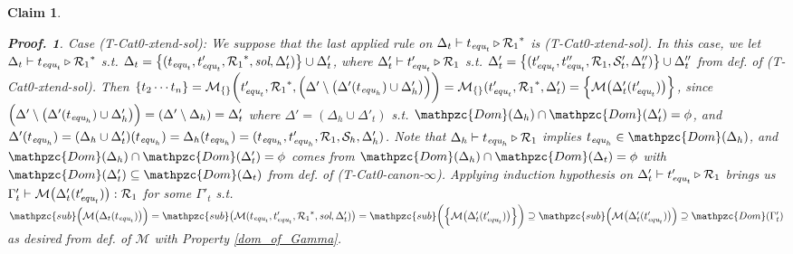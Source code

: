 \documentclass[12pt]{article}
\newtheorem{Claim}{Claim}[section]
\newtheorem{Proof}{Proof.}
\begin{document}
\begin{Claim}
\begin{Proof}
    Case (T-Cat0-xtend-sol): We suppose that the last applied rule on
    $\Delta_t \vdash t_{\text{\it equ}_t} \triangleright {\mathcal{R}_1}^*$
    is (T-Cat0-xtend-sol). In this case, we let
    $\Delta_t \vdash t_{\text{\it equ}_t} \triangleright {\mathcal{R}_1}^*$
    s.t. $\Delta_t = \bigl\{(t_{\text{\it equ}_t}, t'_{\text{\it equ}_t},
    {\mathcal{R}_1}^*, \text{\it sol}, \Delta'_t) \bigr\} \cup \Delta'_t$,
    where $\Delta'_t \vdash t'_{\text{\it equ}_t} \triangleright
    \mathcal{R}_1$ s.t. $\Delta'_t = \bigl\{(t'_{\text{\it equ}_t},
    t''_{\text{\it equ}_t}, \mathcal{R}_1, \mathcal{S}'_t, \Delta''_t)
    \bigr\} \cup \Delta''_t$ from def. of (T-Cat0-xtend-sol). Then
    $\{t_2 \cdots t_n\} = \mathcal{M}_{\{\}}\biggl(t'_{\text{\it equ}_t},
    {\mathcal{R}_1}^*, \Bigl(\Delta' \setminus \bigl(\Delta'(
    t_{\text{\it equ}_h}) \cup \Delta'_h \bigr) \Bigr) \biggr) =
    \mathcal{M}_{\{\}}(t'_{\text{\it equ}_t}, {\mathcal{R}_1}^*, \Delta'_t)
    = \Bigl\{\mathcal{M}\bigl(\Delta'_t(t'_{\text{\it equ}_t}) \bigr)
    \Bigr\}$, since
    $\Bigl(\Delta' \setminus \bigl(\Delta'(t_{\text{\it equ}_h})
    \cup \Delta'_h \bigr) \Bigr) = (\Delta' \setminus \Delta_h) =
    \Delta'_t$ where $\Delta' = (\Delta_h \cup \Delta'_t)$ s.t.
    $\mathpzc{Dom}(\Delta_h) \cap \mathpzc{Dom}(\Delta'_t) = \phi$, and
    $\Delta'(t_{\text{\it equ}_h}) = (\Delta_h \cup \Delta'_t)(
    t_{\text{\it equ}_h}) = \Delta_h(t_{\text{\it equ}_h}) =
    (t_{\text{\it equ}_h}, t'_{\text{\it equ}_h}, \mathcal{R}_1,
    \mathcal{S}_h, \Delta'_h )$. Note that
    $\Delta_h \vdash t_{\text{\it equ}_h} \triangleright \mathcal{R}_1$
    implies $t_{\text{\it equ}_h} \in \mathpzc{Dom}(\Delta_h)$, and
    $\mathpzc{Dom}(\Delta_h) \cap \mathpzc{Dom}(\Delta'_t) = \phi$ comes
    from $\mathpzc{Dom}(\Delta_h) \cap \mathpzc{Dom}(\Delta_t) = \phi$ with
    $\mathpzc{Dom}(\Delta'_t) \subseteq \mathpzc{Dom}(\Delta_t)$ from def.
    of (T-Cat0-canon-$\infty$). Applying induction hypothesis on
    $\Delta'_t \vdash t'_{\text{\it equ}_t} \triangleright \mathcal{R}_1$
    brings us $\Gamma'_t \vdash \mathcal{M}\bigl(\Delta'_t(
    t'_{\text{\it equ}_t}) \bigr) : \mathcal{R}_1$ for some
    $\Gamma'_t$ s.t. $\mathpzc{sub}\Bigl(\mathcal{M}\bigl(\Delta_t(
    t_{\text{\it equ}_t}) \bigr) \Bigr) = \mathpzc{sub}\bigl(\mathcal{M}(
    t_{\text{\it equ}_t}, t'_{\text{\it equ}_t},  {\mathcal{R}_1}^*,
    \text{\it sol}, \Delta'_t ) \bigr) = \mathpzc{sub}\biggl(\Bigl\{
    \mathcal{M}\bigl(\Delta'_t(t'_{\text{\it equ}_t}) \bigr) \Bigr\}
    \biggr) \supseteq
    \mathpzc{sub}\Bigl(\mathcal{M}\bigl(\Delta'_t(t'_{\text{\it equ}_t})
    \bigr) \Bigr) \supseteq \mathpzc{Dom}(\Gamma'_t)$ as desired from
    def. of $\mathcal{M}$ with Property \ref{dom_of_Gamma}.
    

\end{Proof}
\end{Claim}
\end{document}
